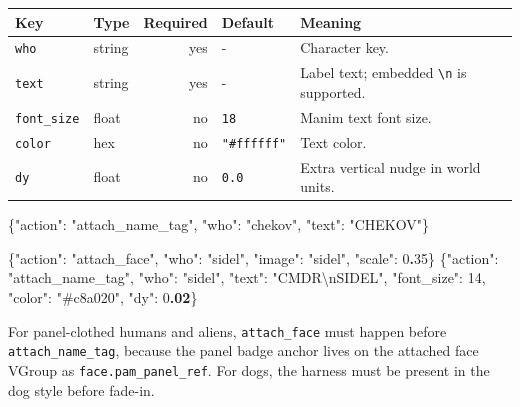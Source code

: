 \documentclass[
  12pt,
  letterpaper,
]{book}
\newenvironment{Shaded}{}{}
\newcommand{\CharTok}[1]{\textcolor[rgb]{0.25,0.44,0.63}{#1}}
\newcommand{\DataTypeTok}[1]{\textcolor[rgb]{0.56,0.13,0.00}{#1}}
\newcommand{\DecValTok}[1]{\textcolor[rgb]{0.25,0.63,0.44}{#1}}
\newcommand{\ErrorTok}[1]{\textcolor[rgb]{1.00,0.00,0.00}{\textbf{#1}}}
\newcommand{\FunctionTok}[1]{\textcolor[rgb]{0.02,0.16,0.49}{#1}}
\newcommand{\StringTok}[1]{\textcolor[rgb]{0.25,0.44,0.63}{#1}}
\begin{document}
\begin{longtable}[]{@{}llrll@{}}
\toprule\noalign{}
Key & Type & Required & Default & Meaning \\
\midrule\noalign{}
\endhead
\bottomrule\noalign{}
\endlastfoot
\texttt{who} & string & yes & - & Character key. \\
\texttt{text} & string & yes & - & Label text; embedded
\texttt{\textbackslash{}n} is supported. \\
\texttt{font\_size} & float & no & \texttt{18} & Manim text font
size. \\
\texttt{color} & hex & no & \texttt{"\#ffffff"} & Text color. \\
\texttt{dy} & float & no & \texttt{0.0} & Extra vertical nudge in world
units. \\
\end{longtable}

\begin{Shaded}
\begin{Highlighting}[]
\FunctionTok{\{}\DataTypeTok{"action"}\FunctionTok{:} \StringTok{"attach\_name\_tag"}\FunctionTok{,} \DataTypeTok{"who"}\FunctionTok{:} \StringTok{"chekov"}\FunctionTok{,} \DataTypeTok{"text"}\FunctionTok{:} \StringTok{"CHEKOV"}\FunctionTok{\}}
\end{Highlighting}
\end{Shaded}

\begin{Shaded}
\begin{Highlighting}[]
\FunctionTok{\{}\DataTypeTok{"action"}\FunctionTok{:} \StringTok{"attach\_face"}\FunctionTok{,} \DataTypeTok{"who"}\FunctionTok{:} \StringTok{"sidel"}\FunctionTok{,} \DataTypeTok{"image"}\FunctionTok{:} \StringTok{"sidel"}\FunctionTok{,} \DataTypeTok{"scale"}\FunctionTok{:} \DecValTok{0}\ErrorTok{.}\DecValTok{35}\FunctionTok{\}}
\FunctionTok{\{}\DataTypeTok{"action"}\FunctionTok{:} \StringTok{"attach\_name\_tag"}\FunctionTok{,} \DataTypeTok{"who"}\FunctionTok{:} \StringTok{"sidel"}\FunctionTok{,}
 \DataTypeTok{"text"}\FunctionTok{:} \StringTok{"CMDR}\CharTok{\textbackslash{}n}\StringTok{SIDEL"}\FunctionTok{,} \DataTypeTok{"font\_size"}\FunctionTok{:} \DecValTok{14}\FunctionTok{,} \DataTypeTok{"color"}\FunctionTok{:} \StringTok{"\#c8a020"}\FunctionTok{,} \DataTypeTok{"dy"}\FunctionTok{:} \DecValTok{0}\ErrorTok{.02}\FunctionTok{\}}
\end{Highlighting}
\end{Shaded}

For panel-clothed humans and aliens, \texttt{attach\_face} must happen
before \texttt{attach\_name\_tag}, because the panel badge anchor lives
on the attached face VGroup as \texttt{face.pam\_panel\_ref}. For dogs,
the harness must be present in the dog style before fade-in.
\end{document}
